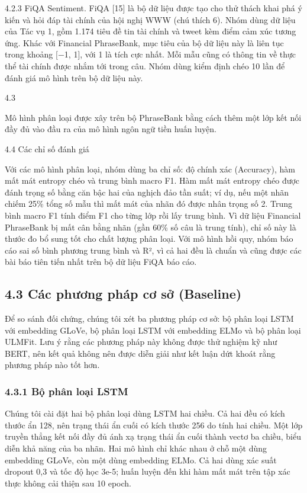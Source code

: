 4.2.3 FiQA Sentiment. FiQA {[}15{]} là bộ dữ liệu được tạo cho thử thách khai phá ý kiến và hỏi đáp tài chính của hội nghị WWW  (chú thích 6). Nhóm dùng dữ liệu của Tác vụ 1, gồm 1.174 tiêu đề tin tài chính và tweet kèm điểm cảm xúc tương ứng. Khác với Financial PhraseBank, mục tiêu của bộ dữ liệu này là liên tục trong khoảng {[}\ensuremath{-}1, 1{]}, với 1 là tích cực nhất. Mỗi mẫu cũng có thông tin về thực thể tài chính được nhắm tới trong câu. Nhóm dùng kiểm định chéo 10 lần để đánh giá mô hình trên bộ dữ liệu này.

4.3

Mô hình phân loại được xây trên bộ PhraseBank bằng cách thêm một lớp kết nối đầy đủ vào đầu ra của mô hình ngôn ngữ tiền huấn luyện.

4.4 Các chỉ số đánh giá

Với các mô hình phân loại, nhóm dùng ba chỉ số: độ chính xác (Accuracy), hàm mất mát entropy chéo và trung bình macro F1. Hàm mất mát entropy chéo được đánh trọng số bằng căn bậc hai của nghịch đảo tần suất; ví dụ, nếu một nhãn chiếm 25\% tổng số mẫu thì mất mát của nhãn đó được nhân trọng số 2. Trung bình macro F1 tính điểm F1 cho từng lớp rồi lấy trung bình. Vì dữ liệu Financial PhraseBank bị mất cân bằng nhãn (gần 60\% số câu là trung tính), chỉ số này là thước đo bổ sung tốt cho chất lượng phân loại. Với mô hình hồi quy, nhóm báo cáo sai số bình phương trung bình và R², vì cả hai đều là chuẩn và cũng được các bài báo tiên tiến nhất trên bộ dữ liệu FiQA báo cáo.

\subsection{4.3 Các phương pháp cơ sở (Baseline)}

Để so sánh đối chứng, chúng tôi xét ba phương pháp cơ sở: bộ phân loại LSTM với embedding GLoVe, bộ phân loại LSTM với embedding ELMo và bộ phân loại ULMFit. Lưu ý rằng các phương pháp này không được thử nghiệm kỹ như BERT, nên kết quả không nên được diễn giải như kết luận dứt khoát rằng phương pháp nào tốt hơn.

\subsubsection{4.3.1 Bộ phân loại LSTM}

Chúng tôi cài đặt hai bộ phân loại dùng LSTM hai chiều. Cả hai đều có kích thước ẩn 128, nên trạng thái ẩn cuối có kích thước 256 do tính hai chiều. Một lớp truyền thẳng kết nối đầy đủ ánh xạ trạng thái ẩn cuối thành vectơ ba chiều, biểu diễn khả năng của ba nhãn. Hai mô hình chỉ khác nhau ở chỗ một dùng embedding GLoVe, còn một dùng embedding ELMo. Cả hai dùng xác suất dropout 0,3 và tốc độ học 3e-5; huấn luyện đến khi hàm mất mát trên tập xác thực không cải thiện sau 10 epoch.

